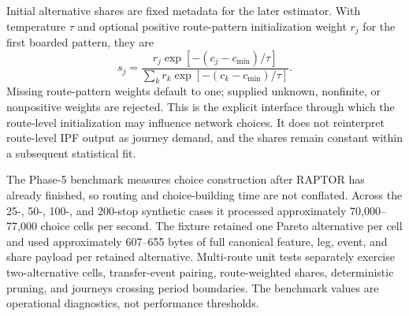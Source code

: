 Initial alternative shares are fixed metadata for the later estimator.  With
temperature $\tau$ and optional positive route-pattern initialization weight
$r_j$ for the first boarded pattern, they are
\[
s_j=
\frac{r_j\exp[-(c_j-c_{\min})/\tau]}
     {\sum_k r_k\exp[-(c_k-c_{\min})/\tau]}.
\]
Missing route-pattern weights default to one; supplied unknown, nonfinite, or
nonpositive weights are rejected.  This is the explicit interface through
which the route-level initialization may influence network choices.  It does
not reinterpret route-level IPF output as journey demand, and the shares remain
constant within a subsequent statistical fit.

The Phase-5 benchmark measures choice construction after RAPTOR has already
finished, so routing and choice-building time are not conflated.  Across the
25-, 50-, 100-, and 200-stop synthetic cases it processed approximately
70,000--77,000 choice cells per second.  The fixture retained one Pareto
alternative per cell and used approximately 607--655 bytes of full canonical
feature, leg, event, and share payload per retained alternative.  Multi-route unit tests separately exercise
two-alternative cells, transfer-event pairing, route-weighted shares,
deterministic pruning, and journeys crossing period boundaries.  The benchmark
values are operational diagnostics, not performance thresholds.

